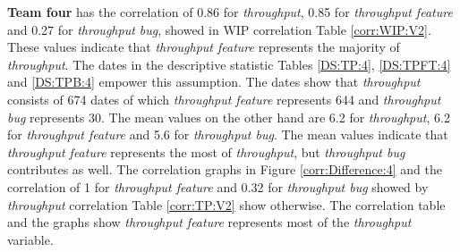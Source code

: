 \documentclass[UKenglish]{ifimaster}  %
\begin{document}
\textbf{Team four} has the correlation of 0.86 for \textit{throughput}, 0.85 for \textit{throughput feature}  and 0.27 for \textit{throughput bug}, showed in WIP correlation Table \ref{corr:WIP:V2}. These values indicate that \textit{throughput feature} represents the majority of \textit{throughput}. The dates in the descriptive statistic Tables \ref{DS:TP:4}, \ref{DS:TPFT:4} and \ref{DS:TPB:4} empower this assumption. The dates show that \textit{throughput} consists of 674 dates of which \textit{throughput feature} represents 644 and \textit{throughput bug} represents 30. The mean values on the other hand are 6.2 for \textit{throughput}, 6.2 for \textit{throughput feature} and 5.6 for \textit{throughput bug}. The mean values indicate that \textit{throughput feature} represents the most of \textit{throughput}, but \textit{throughput bug} contributes as well. The correlation graphs in Figure \ref{corr:Difference:4} and the correlation of 1 for \textit{throughput feature} and 0.32 for \textit{throughput bug} showed by \textit{throughput} correlation Table \ref{corr:TP:V2} show otherwise. The correlation table and the graphs show  \textit{throughput feature} represents most of the \textit{throughput} variable.
\end{document}
